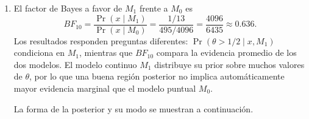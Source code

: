 \begin{enumerate}
  \[
    \Pr(M_0\mid x)=\frac{495/4096}{495/4096+1/13}
    =\frac{6435}{10531}\approx0.611,
    \qquad
    \Pr(M_1\mid x)=\frac{4096}{10531}\approx0.389.
  \]
  \item El factor de Bayes a favor de $M_1$ frente a $M_0$ es
  \[
    BF_{10}=\frac{\Pr(x\mid M_1)}{\Pr(x\mid M_0)}
    =\frac{1/13}{495/4096}=\frac{4096}{6435}\approx0.636.
  \]
  Los resultados responden preguntas diferentes: $\Pr(\theta>1/2\mid x,M_1)$ condiciona en $M_1$, mientras que $BF_{10}$ compara la evidencia promedio de los dos modelos. El modelo continuo $M_1$ distribuye su prior sobre muchos valores de $\theta$, por lo que una buena región posterior no implica automáticamente mayor evidencia marginal que el modelo puntual $M_0$.

  La forma de la posterior y su modo se muestran a continuación.
  \begin{center}
  \end{center}
\end{enumerate}

